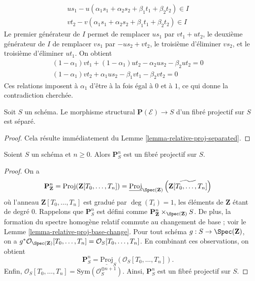 \begin{example}
$$
\begin{matrix}
us_1 - u(\alpha_1s_1 + \alpha_2s_2 + \beta_1t_1 + \beta_2t_2)
\in I \\
vt_2 - v(\alpha_1s_1 + \alpha_2s_2 + \beta_1t_1 + \beta_2t_2)
\in I
\end{matrix}
$$
Le premier générateur de $I$ permet de
remplacer $us_1$ par $vt_1 + ut_2$,
le deuxième générateur de $I$ de remplacer $vs_1$
par $-us_2 + vt_2$, le troisième d'éliminer
$vs_2$, et le troisième d'éliminer $ut_1$. On obtient
$$
\begin{matrix}
(1 - \alpha_1)vt_1 + (1 - \alpha_1)ut_2 - \alpha_2us_2 - \beta_2ut_2 = 0 \\
(1 - \alpha_1)vt_2 + \alpha_1us_2 - \beta_1vt_1 - \beta_2vt_2 = 0
\end{matrix}
$$
Ces relations imposent à $\alpha_1$ d'être à la fois égal à $0$ et à $1$,
ce qui donne la contradiction cherchée.
\end{example}


\begin{lemma}
\label{lemma-projective-bundle-separated}
Soit $S$ un schéma. Le morphisme structural
$\mathbf{P}(\mathcal{E}) \to S$ d'un
fibré projectif sur $S$ est séparé.
\end{lemma}

\begin{proof}
Cela résulte immédiatement du Lemme \ref{lemma-relative-proj-separated}.
\end{proof}

\begin{lemma}
\label{lemma-projective-space-bundle}
Soient $S$ un schéma et $n \geq 0$. Alors $\mathbf{P}^n_S$ est un fibré
projectif sur $S$.
\end{lemma}

\begin{proof}
On a
$$
\mathbf{P}^n_{\mathbf{Z}} =
\text{Proj}(\mathbf{Z}[T_0, \ldots, T_n]) =
\underline{\text{Proj}}_{\Spec(\mathbf{Z})}
\left(\widetilde{\mathbf{Z}[T_0, \ldots, T_n]}\right)
$$
où l'anneau $\mathbf{Z}[T_0, \ldots, T_n]$ est gradué par
$\deg(T_i) = 1$, les éléments de $\mathbf{Z}$ étant de degré $0$.
Rappelons que $\mathbf{P}^n_S$ est défini comme
$\mathbf{P}^n_{\mathbf{Z}} \times_{\Spec(\mathbf{Z})} S$.
De plus, la formation du spectre homogène relatif commute au changement de
base ; voir le Lemme \ref{lemma-relative-proj-base-change}.
Pour tout schéma $g : S \to \Spec(\mathbf{Z})$, on a
$g^*\mathcal{O}_{\Spec(\mathbf{Z})}[T_0, \ldots, T_n]
= \mathcal{O}_S[T_0, \ldots, T_n]$.
En combinant ces observations, on obtient
$$
\mathbf{P}^n_S = \underline{\text{Proj}}_S(\mathcal{O}_S[T_0, \ldots, T_n]).
$$
Enfin,
$\mathcal{O}_S[T_0, \ldots, T_n] = \text{Sym}(\mathcal{O}_S^{\oplus n + 1})$.
Ainsi, $\mathbf{P}^n_S$ est un fibré projectif sur $S$.
\end{proof}




